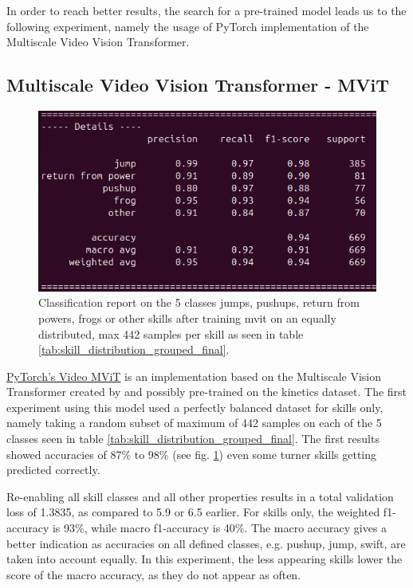 In order to reach better results, the search for a pre-trained model leads us to the following experiment, namely the usage of PyTorch implementation of the Multiscale Video Vision Transformer.

\subsection{Multiscale Video Vision Transformer - MViT}


\begin{figure}
    \centering
    \includegraphics[width=0.7\linewidth]{img/mvit-5-classes}
    \caption[Classification report on only 5 skill classes]{Classification report on the 5 classes jumps, pushups, return from powers, frogs or other skills after training mvit on an equally distributed, max 442 samples per skill as seen in table \ref{tab:skill_distribution_grouped_final}.}
    \label{fig:mvit-5-classes}
\end{figure}


\href{https://pytorch.org/vision/main/models/video_mvit.html}{PyTorch's Video MViT} is an implementation based on the Multiscale Vision Transformer created by \textcite{Fan2021} and possibly pre-trained on the kinetics dataset.
The first experiment using this model used a perfectly balanced dataset for skills only, namely taking a random subset of maximum of 442 samples on each of the 5 classes seen in table \ref{tab:skill_distribution_grouped_final}.
The first results showed accuracies of 87\% to 98\% (see fig. \ref{fig:mvit-5-classes}) even some turner skills getting predicted correctly.

Re-enabling all skill classes and all other properties results in a total validation loss of 1.3835, as compared to 5.9 or 6.5 earlier.
For skills only, the weighted f1-accuracy is 93\%, while macro f1-accuracy is 40\%.
The macro accuracy gives a better indication as accuracies on all defined classes, e.g. pushup, jump, swift, are taken into account equally. In this experiment, the less appearing skills lower the score of the macro accuracy, as they do not appear as often.

